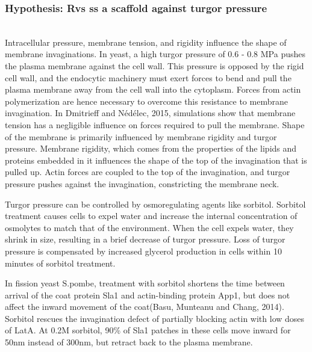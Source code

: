 \subsubsection{Hypothesis: Rvs ss a scaffold against turgor pressure} 
	
	\mbox{}\\
Intracellular pressure, membrane tension, and rigidity influence the shape of membrane invaginations. In yeast, a high turgor pressure of 0.6 - 0.8 MPa pushes the plasma membrane against the cell wall. This pressure is opposed by the rigid cell wall, and the endocytic machinery must exert forces to bend and pull the plasma membrane away from the cell wall into the cytoplasm. Forces from actin polymerization are hence necessary to overcome this resistance to membrane invagination. In Dmitrieff and Nédélec, 2015, simulations show that membrane tension has a negligible influence on forces required to pull the membrane. Shape of the membrane is primarily influenced by membrane rigidity and turgor pressure. Membrane rigidity, which comes from the properties of the lipids and proteins embedded in it influences the shape of the top of the invagination that is pulled up. Actin forces are coupled to the top of the invagination, and turgor pressure pushes against the invagination, constricting the membrane neck.  

Turgor pressure can be controlled by osmoregulating agents like sorbitol. Sorbitol treatment causes cells to expel water and increase the internal concentration of osmolytes to match that of the environment. When the cell expels water, they shrink in size, resulting in a brief decrease of turgor pressure. Loss of turgor pressure is compensated by increased glycerol production in cells within 10 minutes of sorbitol treatment.


In fission yeast S.pombe, treatment with sorbitol shortens the time between arrival of the coat protein Sla1 and actin-binding protein App1, but does not affect the inward movement of the coat(Basu, Munteanu and Chang, 2014). Sorbitol rescues the invagination defect of partially blocking actin with low doses of LatA. At 0.2M sorbitol, 90\% of Sla1 patches in these cells move inward for 50nm instead of 300nm, but retract back to the plasma membrane. 



